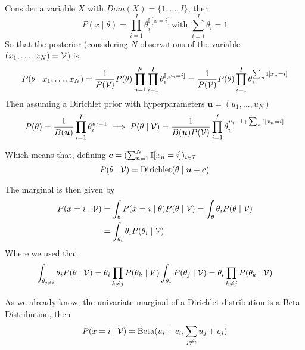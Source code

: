  Consider a variable \(X\) with \(Dom(X) = \{1, \dots, I\}\), then
 \[
   P(x \mid \theta) = \prod_{i = 1}^{I}\theta_{i}^{\mathbb{I}[x = i]} \text{
   with  } \sum_{i=1}^{I}\theta_{i} = 1
\]
So that the posterior (considering \(N\) observations of the variable
\((x_{1}, \dots, x_{N}) = \mathcal{V}\)) is
\[
  P(\theta \mid x_{1},\dots,x_{N}) = \frac{1}{P(\mathcal{V})} P(\theta) \prod_{n = 1}^{N}\prod_{i =1 }^{I}\theta_{i}^{\mathbb{I}[x_{n} = i]} =  \frac{1}{P(\mathcal{V})} P(\theta) \prod_{i = 1}^{I} \theta_{i}^{\sum_{n} \mathbb{I}[x_{n}=i]}
\]
Then assuming a Dirichlet prior with hyperparameters \(\bm{u} = (u_{1}, \dots, u_{N})\)
\[
  P(\theta) = \frac{1}{B(\bm{u})}\prod_{i =1}^{I}\theta_{i}^{u_{i}-1} \implies P(\theta \mid \mathcal{V}) = \frac{1}{B(\bm{u})P(\mathcal{V})}\prod_{i=1}^{I}\theta_{i}^{u_{i}-1 + \sum_{n}\mathbb{I}[x_{n} = i]}
\]

Which means that, defining \(\bm{c} = ( \sum_{n=1}^{N}\mathbb{I}[x_{n} = i])_{i \in \mathcal{I}}\)
\[
  P(\theta \mid \mathcal{V}) = \text{Dirichlet}(\theta \mid \bm{u} + \bm{c})
\]

The marginal is then given by
\[
  \begin{aligned}
    P(x=i \mid \mathcal{V}) &= \int_{\theta}P(x=i \mid \theta)P(\theta \mid \mathcal{V}) =  \int_{\theta}\theta_{i}P(\theta \mid \mathcal{V})\\
    &=  \int_{\theta_{i}}\theta_{i}P(\theta_{i} \mid \mathcal{V})
\end{aligned}
\]
Where we used that
\[\int_{\theta_{j \neq i}}\theta_{i} P(\theta \mid \mathcal{V}) = \theta_{i}\prod_{k\neq j}P(\theta_{k} \mid V) \int_{\theta_{j}}P(\theta_{j}\mid \mathcal{V}) = \theta_{i} \prod_{k \neq j}P(\theta_{k} \mid \mathcal{V})\]


As we already know, the univariate marginal of a Dirichlet distribution is a
Beta Distribution, then
\[
  P(x = i \mid \mathcal{V}) = \text{Beta}(u_{i} + c_{i}, \sum_{j\neq i} u_{j} + c_{j})
\]
